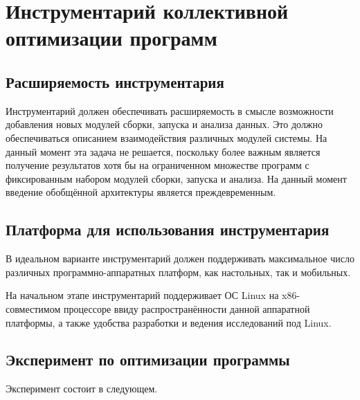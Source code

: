 \section{Инструментарий коллективной оптимизации программ}


\subsection{Расширяемость инструментария}
Инструментарий должен обеспечивать расширяемость в смысле возможности добавления новых модулей сборки, запуска и анализа данных. Это должно обеспечиваться описанием взаимодействия различных модулей системы. На данный момент эта задача не решается, поскольку более важным является получение результатов хотя бы на ограниченном множестве программ с фиксированным набором модулей сборки, запуска и анализа. На данный момент введение обобщённой архитектуры является преждевременным.


\subsection{Платформа для использования инструментария}
В идеальном варианте инструментарий должен поддерживать максимальное число различных программно-аппаратных платформ, как настольных, так и мобильных.

На начальном этапе инструментарий поддерживает ОС Linux на x86-совместимом процессоре ввиду распространённости данной аппаратной платформы, а также удобства разработки и ведения исследований под Linux.


\subsection{Эксперимент по оптимизации программы}
Эксперимент состоит в следующем.

